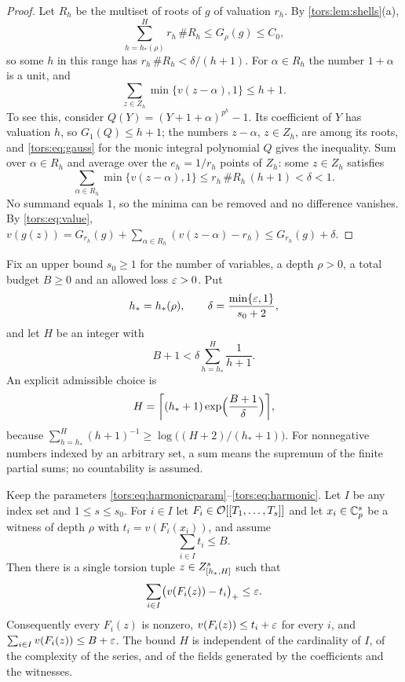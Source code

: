 \begin{proof}
Let $R_h$ be the multiset of roots of $g$ of valuation $r_h$. By
\cref{tors:lem:shells}(a),
\[
  \sum_{h=h_*(\rho)}^{H}r_h\,\#R_h\le G_\rho(g)\le C_0 ,
\]
so some $h$ in this range has $r_h\,\#R_h<\delta/(h+1)$. For $\alpha\in R_h$ the number
$1+\alpha$ is a unit, and
\[
  \sum_{z\in Z_h}\min\{v(z-\alpha),1\}\le h+1 .
\]
To see this, consider $Q(Y)=(Y+1+\alpha)^{p^h}-1$. Its coefficient of $Y$ has valuation
$h$, so $G_1(Q)\le h+1$; the numbers $z-\alpha$, $z\in Z_h$, are among its roots, and
\eqref{tors:eq:gauss} for the monic integral polynomial $Q$ gives the inequality. Sum
over $\alpha\in R_h$ and average over the $e_h=1/r_h$ points of $Z_h$: some $z\in Z_h$
satisfies
\[
  \sum_{\alpha\in R_h}\min\{v(z-\alpha),1\}\le r_h\,\#R_h\,(h+1)<\delta<1 .
\]
No summand equals $1$, so the minima can be removed and no difference vanishes. By
\eqref{tors:eq:value},
$v(g(z))=G_{r_h}(g)+\sum_{\alpha\in R_h}(v(z-\alpha)-r_h)\le G_{r_h}(g)+\delta$.
\end{proof}

Fix an upper bound $s_0\ge1$ for the number of variables, a depth $\rho>0$, a total
budget $B\ge0$ and an allowed loss $\varepsilon>0$. Put
\begin{equation}\label{tors:eq:harmonicparam}
  h_*=h_*(\rho),\qquad \delta=\frac{\min\{\varepsilon,1\}}{s_0+2},
\end{equation}
and let $H$ be an integer with
\begin{equation}\label{tors:eq:harmonic}
  B+1<\delta\sum_{h=h_*}^{H}\frac1{h+1}.
\end{equation}
An explicit admissible choice is
\begin{equation}\label{tors:eq:harmonicH}
  H=\ceil*{(h_*+1)\exp\Bigl(\frac{B+1}{\delta}\Bigr)},
\end{equation}
because $\sum_{h=h_*}^H(h+1)^{-1}\ge\log\bigl((H+2)/(h_*+1)\bigr)$. For nonnegative
numbers indexed by an arbitrary set, a sum means the supremum of the finite partial sums;
no countability is assumed.

\begin{theorem}
\label{tors:thm:uniform}
Keep the parameters \eqref{tors:eq:harmonicparam}--\eqref{tors:eq:harmonic}. Let $I$ be
any index set and $1\le s\le s_0$. For $i\in I$ let $F_i\in\mathcal{O}[[T_1,\dots,T_s]]$ and let
$x_i\in\mathbb{C}_p^s$ be a witness of depth $\rho$ with $t_i=v(F_i(x_i))$, and assume
\[
  \sum_{i\in I}t_i\le B .
\]
Then there is a single torsion tuple $z\in Z_{[h_*,H]}^s$ such that
\begin{equation}\label{tors:eq:excess}
  \sum_{i\in I}\bigl(v(F_i(z))-t_i\bigr)_+\le\varepsilon .
\end{equation}
Consequently every $F_i(z)$ is nonzero, $v(F_i(z))\le t_i+\varepsilon$ for every $i$, and
$\sum_{i\in I}v(F_i(z))\le B+\varepsilon$. The bound $H$ is independent of the cardinality of
$I$, of the complexity of the series, and of the fields generated by the coefficients and
the witnesses.
\end{theorem}

